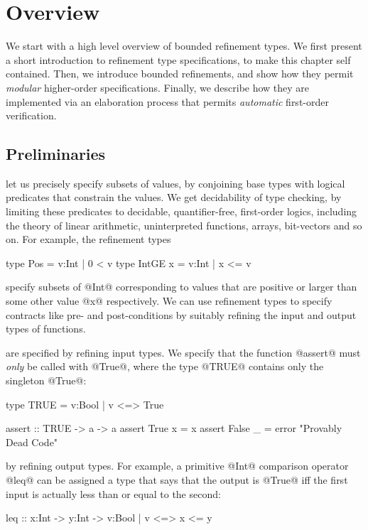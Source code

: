 \section{Overview}\label{sec:boundedrefinements:overview}

We start with a high level overview of bounded refinement types.
%
We first present a short introduction to refinement type specifications, 
to make this chapter self contained.
%
Then, we introduce bounded refinements,
and show how they permit \emph{modular} higher-order specifications.
%
Finally, we describe how they are implemented via an elaboration
process that permits \emph{automatic} first-order verification.

\subsection{Preliminaries}

 let us precisely specify subsets of values,
by conjoining base types with logical predicates that constrain the values.
We get decidability of type checking, by limiting these predicates to
decidable, quantifier-free, first-order logics, including the theory
of linear arithmetic, uninterpreted functions, arrays, bit-vectors
and so on. 
%
For example, the refinement types
%
\begin{code}
  type Pos     = {v:Int | 0 < v}
  type IntGE x = {v:Int | x <= v}
\end{code}
%
specify subsets of @Int@ corresponding to values
that are positive or larger than some other value @x@
respectively. 
%
We can use refinement types to specify contracts
like pre- and post-conditions by suitably refining the input
and output types of functions.

 are specified by refining input types.
We specify that the function @assert@ must
\emph{only} be called with @True@,
%
where the type @TRUE@ contains only the singleton @True@:
%
\begin{code}
  type TRUE = {v:Bool | v <=> True}

  assert         :: TRUE -> a -> a
  assert True x  = x
  assert False _ = error "Provably Dead Code"
\end{code}

 by refining output types.
For example, a primitive @Int@ comparison operator @leq@ can be
assigned a type that says that the output is @True@ iff the
first input is actually less than or equal to the second:
%
\begin{mcode}
  leq :: x:Int -> y:Int -> {v:Bool | v  <=> x <= y}
\end{mcode}

